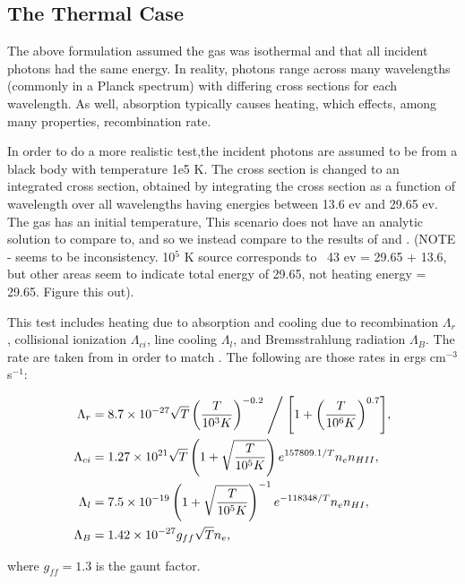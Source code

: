 \subsection{The Thermal Case}
\label{sec:thermalstromgren}

The above formulation assumed the gas was isothermal and that all incident photons had the same energy. In reality, photons range across many wavelengths (commonly in a Planck spectrum) with differing cross sections for each wavelength. As well, absorption typically causes heating, which effects, among many properties, recombination rate.

In order to do a more realistic test,the incident photons are assumed to be from a black body with temperature 1e5 K. The cross section is changed to an integrated cross section, obtained by integrating the cross section as a function of wavelength over all wavelengths having energies between 13.6 ev and 29.65 ev. The gas has an initial temperature, This scenario does not have an analytic solution to compare to, and so we instead compare to the results of \citet{ilievEt06} and \citet{petkovaSpringel09}. (NOTE - seems to be inconsistency. 10$^5$ K source corresponds to ~43 ev = 29.65 + 13.6, but other areas seem to indicate total energy of 29.65, not heating energy = 29.65. Figure this out).

This test includes heating due to absorption and cooling due to recombination $\Lambda_r$, collisional ionization $\Lambda_{ci}$, line cooling $\Lambda_l$, and Bremsstrahlung radiation $\Lambda_B$. The rate are taken from \citet{cen92} in order to match \citet{petkovaSpringel09}. The following are those rates in ergs cm$^{-3}$ s$^{-1}$:

\begin{align}
\label{eq:cencooling}
\Lambda_r & = {8.7\times 10^{-27} \sqrt{T}\left(\frac{T}{10^3 K}\right)^{-0.2}} \Biggm/{\left[1+\left(\frac{T}{10^6 K}\right)^{0.7}\right]}, \\
\Lambda_{ci} & = 1.27\times 10^{21} \sqrt{T}\left(1 + \sqrt{\frac{T}{10^5 K}}\right)e^{157809.1/T} n_e n_{HII},\\
\Lambda_l & = 7.5\times 10^{-19}\left(1+\sqrt{\frac{T}{10^5 K}}\right)^{-1}e^{-118348/T}n_e n_{HI},\\
\Lambda_B & = 1.42\times 10^{-27}g_{ff}\sqrt{T}n_e,
\end{align}

where $g_{ff} = 1.3$ is the gaunt factor.

